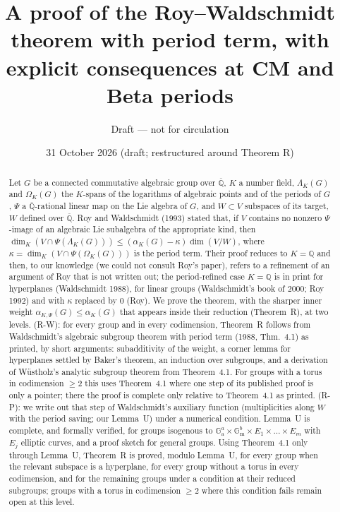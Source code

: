 \documentclass[11pt]{amsart}
\title[The Roy--Waldschmidt theorem with period term]{A proof of the Roy--Waldschmidt theorem with period term, with
explicit consequences at CM and Beta periods}
\author{Draft --- not for circulation}
\date{31 October 2026 (draft; restructured around Theorem R)}
\theoremstyle{definition}
\newcommand{\Qb}{\overline{\mathbb{Q}}}
\newcommand{\Q}{\mathbb{Q}}
\newcommand{\Ga}{\mathbb{G}_{\mathrm a}}
\newcommand{\Gm}{\mathbb{G}_{\mathrm m}}
\begin{document}
\begin{abstract}
Let $G$ be a connected commutative algebraic group over $\Qb$, $K$ a number field, $\Lambda_K(G)$ and $\Omega_K(G)$ the
$K$-spans of the logarithms of algebraic points and of the periods of $G$, $\Psi$ a $\Qb$-rational linear map on the Lie
algebra of $G$, and $W\subset V$ subspaces of its target, $W$ defined over $\Qb$. Roy and Waldschmidt (1993) stated that,
if $V$ contains no nonzero $\Psi$-image of an algebraic Lie subalgebra of the appropriate kind, then
$\dim_K(V\cap\Psi(\Lambda_K(G)))\le(\alpha_K(G)-\kappa)\dim(V/W)$, where $\kappa=\dim_K(V\cap\Psi(\Omega_K(G)))$ is the
period term. Their proof reduces to $K=\Q$ and then, to our knowledge (we could not consult Roy's paper), refers to a
refinement of an argument of Roy that is not written out; the period-refined case $K=\Q$ is in print for hyperplanes
(Waldschmidt 1988), for linear groups (Waldschmidt's book of 2000; Roy 1992) and with $\kappa$ replaced by $0$ (Roy). We
prove the theorem, with the sharper inner weight $\alpha_{K,\Psi}(G)\le\alpha_K(G)$ that appears inside their reduction
(Theorem~R), at two levels. (R-W): for every group and in every codimension, Theorem~R follows from Waldschmidt's algebraic
subgroup theorem with period term (1988, Thm.~4.1) as printed, by short arguments: subadditivity of the weight, a corner
lemma for hyperplanes settled by Baker's theorem, an induction over subgroups, and a derivation of W\"ustholz's analytic
subgroup theorem from Theorem~4.1. For groups with a torus in codimension $\ge2$ this uses Theorem~4.1 where one step of
its published proof is only a pointer; there the proof is complete only relative to Theorem~4.1 as printed. (R-P): we write out that step of Waldschmidt's auxiliary function (multiplicities along $W$ with the period
saving; our Lemma~U) under a numerical condition. Lemma~U is complete, and formally verified, for groups isogenous to
$\Ga^a\times\Gm^b\times E_1\times\dots\times E_m$ with $E_j$ elliptic curves, and a proof sketch for general groups. Using
Theorem~4.1 only through Lemma~U, Theorem~R is proved, modulo Lemma~U, for every group when the relevant subspace is a
hyperplane, for every group without a torus in every codimension, and for the remaining groups under a condition at their
reduced subgroups; groups with a torus in codimension $\ge2$ where this condition fails remain open at this level.


\end{abstract}
\end{document}
